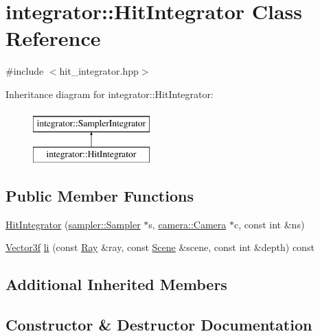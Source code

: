 \hypertarget{classintegrator_1_1HitIntegrator}{}\section{integrator\+::Hit\+Integrator Class Reference}
\label{classintegrator_1_1HitIntegrator}


{\ttfamily \#include $<$hit\+\_\+integrator.\+hpp$>$}

Inheritance diagram for integrator\+::Hit\+Integrator\+:\begin{figure}[H]
\begin{center}
\leavevmode
\includegraphics[height=2.000000cm]{classintegrator_1_1HitIntegrator}
\end{center}
\end{figure}
\subsection*{Public Member Functions}
\begin{DoxyCompactItemize}
\item 
\mbox{\hyperlink{classintegrator_1_1HitIntegrator_ae0cd90f3327de3233fd10709d3aab070}{Hit\+Integrator}} (\mbox{\hyperlink{classsampler_1_1Sampler}{sampler\+::\+Sampler}} $\ast$s, \mbox{\hyperlink{classcamera_1_1Camera}{camera\+::\+Camera}} $\ast$c, const int \&ns)
\item 
\mbox{\hyperlink{cyclop_8hpp_a5a0a2e85b081623ef3f7e7e8d43024f5}{Vector3f}} \mbox{\hyperlink{classintegrator_1_1HitIntegrator_ad496bec99d8dbb65eeb0b32787f087dc}{li}} (const \mbox{\hyperlink{classRay}{Ray}} \&ray, const \mbox{\hyperlink{classScene}{Scene}} \&scene, const int \&depth) const
\end{DoxyCompactItemize}
\subsection*{Additional Inherited Members}


\subsection{Constructor \& Destructor Documentation}
\mbox{\label{classintegrator_1_1HitIntegrator_ae0cd90f3327de3233fd10709d3aab070}} 
